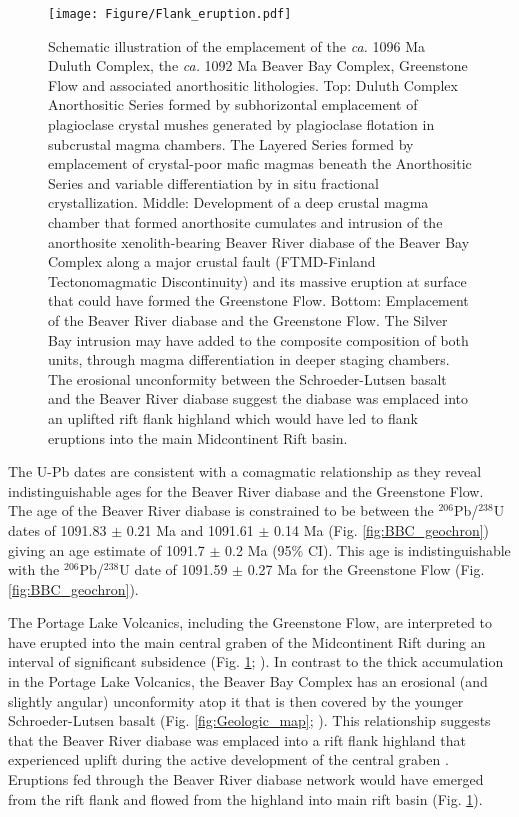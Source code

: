 \begin{figure}
\centering
\noindent\texttt{[image: Figure/Flank\_eruption.pdf]}
\caption{\footnotesize{Schematic illustration of the emplacement of the \textit{ca.} 1096 Ma Duluth Complex, the \textit{ca.} 1092 Ma Beaver Bay Complex, Greenstone Flow and associated anorthositic lithologies. Top: Duluth Complex Anorthositic Series formed by subhorizontal emplacement of plagioclase crystal mushes generated by plagioclase flotation in subcrustal magma chambers. The Layered Series formed by emplacement of crystal-poor mafic magmas beneath the Anorthositic Series and variable differentiation by in situ fractional crystallization. Middle: Development of a deep crustal magma chamber that formed anorthosite cumulates and intrusion of the anorthosite xenolith-bearing Beaver River diabase of the Beaver Bay Complex along a major crustal fault (FTMD-Finland Tectonomagmatic Discontinuity) and its massive eruption at surface that could have formed the Greenstone Flow. Bottom: Emplacement of the Beaver River diabase and the Greenstone Flow. The Silver Bay intrusion may have added to the composite composition of both units, through magma differentiation in deeper staging chambers. The erosional unconformity between the Schroeder-Lutsen basalt and the Beaver River diabase suggest the diabase was emplaced into an uplifted rift flank highland which would have led to flank eruptions into the main Midcontinent Rift basin.}}
\label{fig:Flank_eruption}
\end{figure}

The U-Pb dates are consistent with a comagmatic relationship as they reveal indistinguishable ages for the Beaver River diabase and the Greenstone Flow. The age of the Beaver River diabase is constrained to be between the $^{206}$Pb/$^{238}$U dates of  1091.83 $\pm$ 0.21 Ma and 1091.61 $\pm$ 0.14 Ma (Fig. \ref{fig:BBC_geochron}) giving an age estimate of 1091.7 $\pm$ 0.2 Ma (95\% CI). This age is indistinguishable with the $^{206}$Pb/$^{238}$U date of 1091.59 $\pm$ 0.27 Ma for the Greenstone Flow (Fig. \ref{fig:BBC_geochron}).

The Portage Lake Volcanics, including the Greenstone Flow, are interpreted to have erupted into the main central graben of the Midcontinent Rift during an interval of significant subsidence (Fig. \ref{fig:Flank_eruption}; ). In contrast to the thick accumulation in the Portage Lake Volcanics, the Beaver Bay Complex has an erosional (and slightly angular) unconformity atop it that is then covered by the younger Schroeder-Lutsen basalt (Fig. \ref{fig:Geologic_map}; ). This relationship suggests that the Beaver River diabase was emplaced into a rift flank highland that experienced uplift during the active development of the central graben \cite{Swanson-Hysell2019a}. Eruptions fed through the Beaver River diabase network would have emerged from the rift flank and flowed from the highland into main rift basin (Fig. \ref{fig:Flank_eruption}). 

